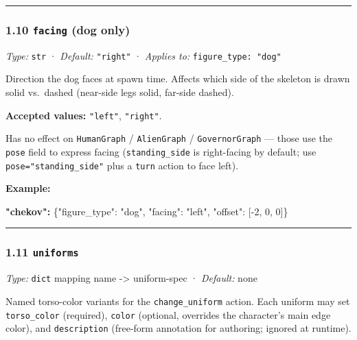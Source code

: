 \documentclass[
  12pt,
  letterpaper,
]{book}
\newenvironment{Shaded}{}{}
\newcommand{\DataTypeTok}[1]{\textcolor[rgb]{0.56,0.13,0.00}{#1}}
\newcommand{\DecValTok}[1]{\textcolor[rgb]{0.25,0.63,0.44}{#1}}
\newcommand{\ErrorTok}[1]{\textcolor[rgb]{1.00,0.00,0.00}{\textbf{#1}}}
\newcommand{\FunctionTok}[1]{\textcolor[rgb]{0.02,0.16,0.49}{#1}}
\newcommand{\OtherTok}[1]{\textcolor[rgb]{0.00,0.44,0.13}{#1}}
\newcommand{\StringTok}[1]{\textcolor[rgb]{0.25,0.44,0.63}{#1}}
\begin{document}
\begin{center}\rule{0.5\linewidth}{0.5pt}\end{center}

\subsubsection{\texorpdfstring{1.10 \texttt{facing} (dog
only)}{1.10 facing (dog only)}}\label{facing-dog-only}

\emph{Type:} \texttt{str} · \emph{Default:} \texttt{"right"} ·
\emph{Applies to:} \texttt{figure\_type:\ "dog"}

Direction the dog faces at spawn time. Affects which side of the
skeleton is drawn solid vs.~dashed (near-side legs solid, far-side
dashed).

\textbf{Accepted values:} \texttt{"left"}, \texttt{"right"}.

Has no effect on \texttt{HumanGraph} / \texttt{AlienGraph} /
\texttt{GovernorGraph} --- those use the \texttt{pose} field to express
facing (\texttt{standing\_side} is right-facing by default; use
\texttt{pose="standing\_side"} plus a \texttt{turn} action to face
left).

\textbf{Example:}

\begin{Shaded}
\begin{Highlighting}[]
\ErrorTok{"chekov":} \FunctionTok{\{}\DataTypeTok{"figure\_type"}\FunctionTok{:} \StringTok{"dog"}\FunctionTok{,} \DataTypeTok{"facing"}\FunctionTok{:} \StringTok{"left"}\FunctionTok{,}
           \DataTypeTok{"offset"}\FunctionTok{:} \OtherTok{[}\DecValTok{{-}2}\OtherTok{,} \DecValTok{0}\OtherTok{,} \DecValTok{0}\OtherTok{]}\FunctionTok{\}}
\end{Highlighting}
\end{Shaded}

\begin{center}\rule{0.5\linewidth}{0.5pt}\end{center}

\subsubsection{\texorpdfstring{1.11
\texttt{uniforms}}{1.11 uniforms}}\label{uniforms}

\emph{Type:} \texttt{dict} mapping name -\textgreater{} uniform-spec ·
\emph{Default:} none

Named torso-color variants for the \texttt{change\_uniform} action. Each
uniform may set \texttt{torso\_color} (required), \texttt{color}
(optional, overrides the character's main edge color), and
\texttt{description} (free-form annotation for authoring; ignored at
runtime).
\end{document}
